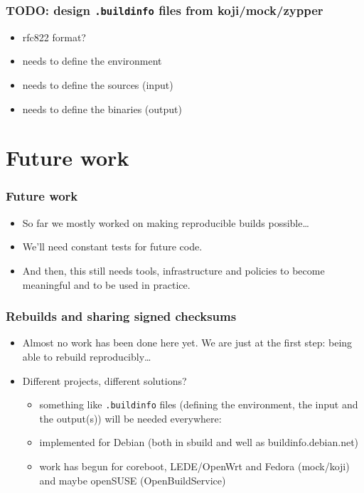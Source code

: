 \documentclass[14pt,aspectratio=169]{beamer}
\begin{document}
\begin{frame}
 \frametitle{TODO: design \texttt{.buildinfo} files from koji/mock/zypper}
 \begin{itemize}
  \item rfc822 format?
  \item needs to define the environment
  \item needs to define the sources (input)
  \item needs to define the binaries (output)
 \end{itemize}
\end{frame}



\section{Future work}

\begin{frame}
 \frametitle{Future work}
 \begin{itemize}
 \item<1-3> So far we mostly worked on making reproducible builds possible…
 \item<2-3> We'll need constant tests for future code.
 \item<3> And then, this still needs tools, infrastructure and policies to become
 meaningful and to be used in practice.
 \end{itemize}
\end{frame}

\begin{frame}
 \frametitle{Rebuilds and sharing signed checksums}
 \begin{itemize}
  \item Almost no work has been done here yet. We are just at the first step:
  being able to rebuild reproducibly…
  \item Different projects, different solutions?
 \begin{itemize}
  \item<2> something like \texttt{.buildinfo} files (defining the environment,
  the input and the output(s)) will be needed everywhere:
  \item<2> implemented for Debian (both in sbuild and well as
  buildinfo.debian.net)
  \item<2> work has begun for coreboot, LEDE/OpenWrt and Fedora (mock/koji)
  and maybe openSUSE (OpenBuildService)
 \end{itemize}
 \end{itemize}
\end{frame}
\end{document}
